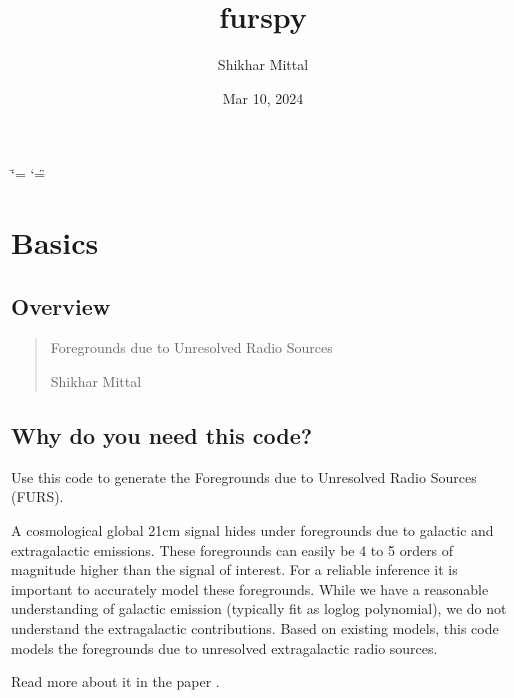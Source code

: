 \documentclass[letterpaper,10pt,english]{sphinxmanual}
\title{furspy}
\date{Mar 10, 2024}
\author{Shikhar Mittal}
\begin{document}
\ifdefined\shorthandoff
  \ifnum\catcode`\=\string=\active\shorthandoff{=}\fi
  \ifnum\catcode`\"=\active{}\fi
\fi

\pagestyle{empty}
\sphinxmaketitle
\pagestyle{plain}
\sphinxtableofcontents
\pagestyle{normal}
\label{\detokenize{index::doc}}


\sphinxstepscope


\chapter{Basics}
\label{\detokenize{basics:basics}}\label{\detokenize{basics::doc}}

\section{Overview}
\label{\detokenize{basics:overview}}\begin{quote}\begin{description}
\sphinxAtStartPar
Foregrounds due to Unresolved Radio Sources

\sphinxAtStartPar
Shikhar Mittal

\sphinxAtStartPar
{}

\end{description}\end{quote}


\section{Why do you need this code?}
\label{\detokenize{basics:why-do-you-need-this-code}}
\sphinxAtStartPar
Use this code to generate the Foregrounds due to Unresolved Radio Sources (FURS).

\sphinxAtStartPar
A cosmological global 21\sphinxhyphen{}cm signal hides under foregrounds due to galactic and extragalactic emissions. These foregrounds can easily be 4 to 5 orders of magnitude higher than the signal of interest. For a reliable inference it is important to accurately model these foregrounds. While we have a reasonable understanding of galactic emission (typically fit as log\sphinxhyphen{}log polynomial), we do not understand the extragalactic contributions. Based on existing models, this code models the foregrounds due to unresolved extragalactic radio sources.

\sphinxAtStartPar
Read more about it in the paper .
\end{document}
